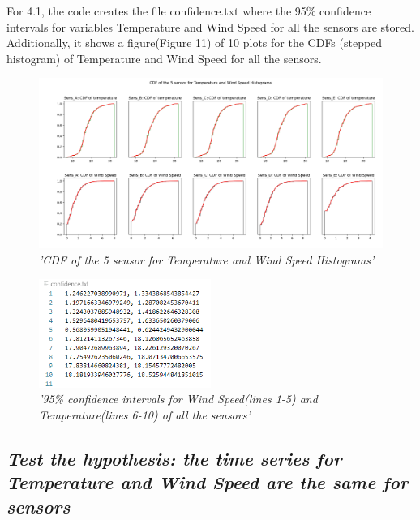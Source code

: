 \documentclass[a4paper,12pt]{article}
\begin{document}
For 4.1, the code creates the file confidence.txt where the 95\% 
confidence intervals for variables Temperature and Wind Speed 
for all the sensors are stored. Additionally, it shows a 
figure(Figure 11) of 10 plots for the CDFs (stepped histogram) of Temperature and Wind Speed for all the sensors.



\begin{figure}[H]
\centering
\includegraphics[width=\textwidth]{Graphs/CDF_of_the_5_sensor_-_Temperature,_Wind_Speed.png}
\caption{\it'CDF of the 5 sensor for Temperature and Wind Speed Histograms'}
\end{figure}



\begin{figure}[H]
    \centering
    \includegraphics[width=0.5\textwidth]{Graphs/Confidence_95perc_Temp_WS.PNG}
    \caption{\it'95\% confidence intervals for Wind Speed(lines 1-5) and Temperature(lines 6-10) of all the sensors'}
    \end{figure}




\subsection{\it Test the hypothesis: the time series for Temperature and Wind Speed are the same for sensors}
\end{document}
